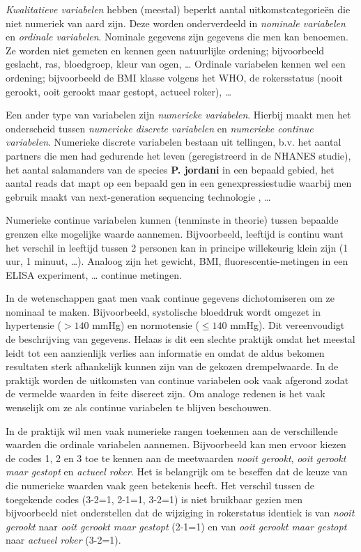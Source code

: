\documentclass[
  12pt,dutch]{book}
\theoremstyle{definition}
\theoremstyle{definition}
\theoremstyle{definition}
\theoremstyle{definition}
\theoremstyle{remark}
\begin{document}
\emph{Kwalitatieve variabelen} hebben (meestal) beperkt aantal
uitkomstcategorieën die niet numeriek van aard zijn. Deze worden
onderverdeeld in \emph{nominale variabelen} en \emph{ordinale variabelen}. Nominale gegevens zijn gegevens die men kan benoemen. Ze worden niet gemeten en kennen geen natuurlijke ordening; bijvoorbeeld geslacht, ras,
bloedgroep, kleur van ogen, \ldots{}
Ordinale variabelen kennen wel een ordening; bijvoorbeeld de BMI klasse volgens het WHO, de rokersstatus (nooit gerookt, ooit gerookt maar
gestopt, actueel roker), \ldots{}

Een ander type van variabelen zijn \emph{numerieke variabelen}. Hierbij maakt men het onderscheid tussen \emph{numerieke discrete variabelen} en \emph{numerieke continue variabelen}.
Numerieke discrete variabelen bestaan uit tellingen, b.v. het aantal partners die men had gedurende het leven (geregistreerd in de NHANES studie), het aantal salamanders van de species \textbf{P. jordani} in een bepaald gebied, het aantal reads dat mapt op een bepaald gen in een genexpressiestudie waarbij men gebruik maakt van next-generation sequencing technologie , \ldots{}

Numerieke continue variabelen kunnen (tenminste in theorie) tussen bepaalde grenzen elke mogelijke waarde aannemen. Bijvoorbeeld, leeftijd is continu want het verschil in leeftijd tussen 2 personen kan in principe willekeurig klein zijn (1 uur, 1 minuut, \ldots). Analoog zijn het gewicht, BMI, fluorescentie-metingen in een ELISA experiment, \ldots{} continue metingen.

In de wetenschappen gaat men vaak continue
gegevens dichotomiseren om ze nominaal te maken. Bijvoorbeeld, systolische
bloeddruk wordt omgezet in hypertensie (\(>140\) mmHg) en normotensie (\(\leq 140\)
mmHg). Dit vereenvoudigt de beschrijving van gegevens. Helaas is dit een
slechte praktijk omdat het meestal leidt tot een aanzienlijk verlies aan informatie en
omdat de aldus bekomen resultaten sterk afhankelijk kunnen zijn van de
gekozen drempelwaarde. In de praktijk worden de uitkomsten van continue
variabelen ook vaak afgerond zodat de vermelde waarden in feite discreet
zijn. Om analoge redenen is het vaak wenselijk om ze als continue variabelen
te blijven beschouwen.

In de praktijk wil men vaak numerieke rangen toekennen aan de verschillende
waarden die ordinale variabelen aannemen. Bijvoorbeeld kan men ervoor kiezen
de codes 1, 2 en 3 toe te kennen aan de meetwaarden \emph{nooit gerookt}, \emph{ooit gerookt maar gestopt} en \emph{actueel roker}.
Het is belangrijk om te beseffen dat de keuze van die numerieke waarden vaak geen betekenis heeft.
Het verschil tussen de toegekende codes (3-2=1, 2-1=1, 3-2=1) is niet bruikbaar gezien men bijvoorbeeld niet onderstellen dat de wijziging in rokerstatus identiek is van \emph{nooit gerookt} naar \emph{ooit gerookt maar gestopt} (2-1=1) en van \emph{ooit gerookt maar gestopt} naar \emph{actueel roker} (3-2=1).
\end{document}
